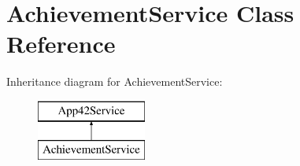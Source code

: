 \hypertarget{class_achievement_service}{\section{Achievement\+Service Class Reference}
\label{class_achievement_service}
}
Inheritance diagram for Achievement\+Service\+:\begin{figure}[H]
\begin{center}
\leavevmode
\includegraphics[height=2.000000cm]{class_achievement_service}
\end{center}
\end{figure}
